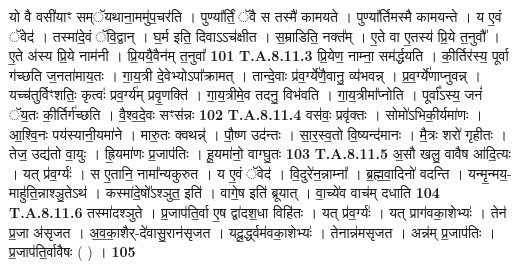 \documentclass[17pt]{extarticle}
\begin{document}
                  यो वै वसी॑याꣳ सम्ॅयथाना॒ममु॑प॒चर॑ति ।  पुण्या᳚र्तिं॒ ॅवै स तस्मै॑ कामयते । पुण्या᳚र्तिमस्मै कामयन्ते । य ए॒वं ॅवेद॑ । तस्मा॑दे॒वं ॅवि॒द्वान् । घ॒र्म इति॒ दिवाऽऽच॑क्षीत । स॒म्राडिति॒ नक्त᳚म् । ए॒ते वा ए॒तस्य॑ प्रि॒ये त॒नुवौ᳚ । ए॒ते अ॑स्य प्रि॒ये नाम॑नी । प्रि॒ययै॒वैन॑म् त॒नुवा᳚ \textbf{ 101} \newline
                  \newline
                                                                  \textbf{ T.A.8.11.3} \newline
                  प्रि॒येण॒ नाम्ना॒ सम॑र्द्धयति । की॒र्तिर॑स्य॒ पूर्वा ग॑च्छति ज॒नता॑माय॒तः । गा॒य॒त्री दे॒वेभ्योऽपा᳚क्रामत् । तान्दे॒वाः प्र॑व॒र्ग्ये॑णै॒वानु॒ व्य॑भवन्न् ।  प्र॒व॒र्ग्ये॑णाप्नुवन्न् । यच्च॑तुर्विꣳशतिः॒ कृत्वः॑ प्रव॒र्ग्य॑म् प्रवृ॒णक्ति॑ । गा॒य॒त्रीमे॒व तदनु॒ विभ॑वति । गा॒य॒त्रीमा᳚प्नोति । पूर्वा᳚ऽस्य॒ जनं॑ ॅय॒तः की॒र्तिर्ग॑च्छति । वै॒श्व॒दे॒वः सꣳस॑न्नः \textbf{ 102} \newline
                  \newline
                                                                  \textbf{ T.A.8.11.4} \newline
                  वस॑वः॒ प्रवृ॑क्तः । सोमो॑ऽभिकी॒र्यमा॑णः । आ॒श्वि॒नः पय॑स्यानी॒यमा॑ने ।  मारु॒तः क्वथन्न्॑ । पौ॒ष्ण उद॑न्तः । सा॒र॒स्व॒तो वि॒ष्यन्द॑मानः । मै॒त्रः शरो॑ गृहीतः । तेज॒ उद्य॑तो वा॒युः । ह्रि॒यमा॑णः प्र॒जाप॑तिः ।  हू॒यमा॑नो॒ वाग्घु॒तः \textbf{ 103} \newline
                  \newline
                                                                  \textbf{ T.A.8.11.5} \newline
                  अ॒सौ खलु॒ वावैष आ॑दि॒त्यः । यत् प्र॑व॒र्ग्यः॑ ।  स ए॒तानि॒ नामा᳚न्यकुरुत । य ए॒वं ॅवेद॑ । वि॒दुरे॑न॒न्नाम्ना᳚ । ब्र॒ह्म॒वा॒दिनो॑ वदन्ति ।  यन्मृ॒न्मय॒-माहु॑ति॒न्नाश्ञु॒तेऽथ॑ । कस्मा॑दे॒षो᳚ऽश्ञुत॒ इति॑ । वागे॒ष इति॑ ब्रूयात् । वा॒च्ये॑व वाच॑म् दधाति \textbf{ 104} \newline
                  \newline
                                                                  \textbf{ T.A.8.11.6} \newline
                  तस्मा॑दश्ञुते । प्र॒जाप॑ति॒र्वा ए॒ष द्वा॑दश॒धा विहि॑तः । यत् प्र॑व॒र्ग्यः॑ । यत् प्राग॑वका॒शेभ्यः॑ । तेन॑ प्र॒जा अ॑सृजत । अ॒व॒का॒शैर्-दे॑वासु॒रान॑सृजत । यदू॒र्द्ध्वम॑वका॒शेभ्यः॑ । तेनान्न॑मसृजत । अन्न॑म् प्र॒जाप॑तिः । प्र॒जाप॑ति॒र्वावैषः ( ) । \textbf{ 105} \newline
                  \newline
\end{document}
